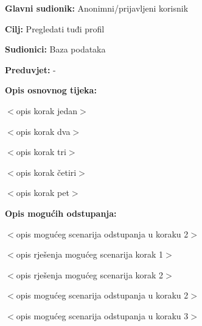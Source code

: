 \noindent {}
\begin{packed_item}

\item \textbf{Glavni sudionik:} Anonimni/prijavljeni korisnik
\item  \textbf{Cilj:} Pregledati tuđi profil
\item  \textbf{Sudionici:} Baza podataka
\item  \textbf{Preduvjet:} -
\item  \textbf{Opis osnovnog tijeka:}

\item[] \begin{packed_enum}

    \item $<$opis korak jedan$>$
    \item $<$opis korak dva$>$
    \item $<$opis korak tri$>$
    \item $<$opis korak četiri$>$
    \item $<$opis korak pet$>$

\end{packed_enum}

\item  \textbf{Opis mogućih odstupanja:}

\item[] \begin{packed_item}

    \item[2.a] $<$opis mogućeg scenarija odstupanja u koraku 2$>$

    \item[] \begin{packed_enum}

        \item $<$opis rješenja mogućeg scenarija korak 1$>$
        \item $<$opis rješenja mogućeg scenarija korak 2$>$

    \end{packed_enum}

\item[2.b] $<$opis mogućeg scenarija odstupanja u koraku 2$>$
\item[3.a] $<$opis mogućeg scenarija odstupanja  u koraku 3$>$

\end{packed_item}

\end{packed_item}

